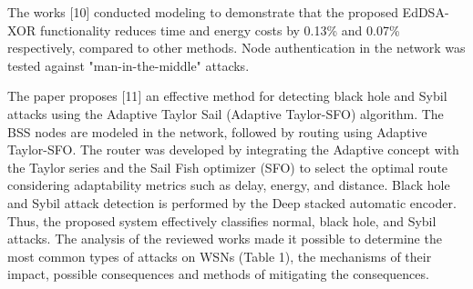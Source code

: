 \begin{multicols}{2}
The works {[}10{]} conducted modeling to demonstrate that the proposed
EdDSA-XOR functionality reduces time and energy costs by 0.13\% and
0.07\% respectively, compared to other methods. Node authentication in
the network was tested against "man-in-the-middle" attacks.

The paper proposes {[}11{]} an effective method for detecting black hole
and Sybil attacks using the Adaptive Taylor Sail (Adaptive Taylor-SFO)
algorithm. The BSS nodes are modeled in the network, followed by routing
using Adaptive Taylor-SFO. The router was developed by integrating the
Adaptive concept with the Taylor series and the Sail Fish optimizer
(SFO) to select the optimal route considering adaptability metrics such
as delay, energy, and distance. Black hole and Sybil attack detection is
performed by the Deep stacked automatic encoder. Thus, the proposed
system effectively classifies normal, black hole, and Sybil attacks. The
analysis of the reviewed works made it possible to determine the most
common types of attacks on WSNs (Table 1), the mechanisms of their
impact, possible consequences and methods of mitigating the
consequences.
\end{multicols}

\newpage

